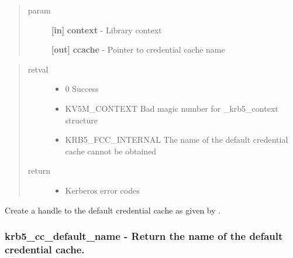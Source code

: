 \documentclass[letterpaper,10pt,english]{sphinxmanual}
\begin{document}
\begin{fulllineitems}
\label{appdev/refs/api/krb5_cc_default:c.krb5_cc_default}
\end{fulllineitems}

\begin{quote}\begin{description}
\item[{param}] \leavevmode
\textbf{{[}in{]}} \textbf{context} - Library context

\textbf{{[}out{]}} \textbf{ccache} - Pointer to credential cache name

\end{description}\end{quote}
\begin{quote}\begin{description}
\item[{retval}] \leavevmode\begin{itemize}
\item {} 
0   Success

\item {} 
KV5M\_CONTEXT   Bad magic number for \_krb5\_context structure

\item {} 
KRB5\_FCC\_INTERNAL   The name of the default credential cache cannot be obtained

\end{itemize}

\item[{return}] \leavevmode\begin{itemize}
\item {} 
Kerberos error codes

\end{itemize}

\end{description}\end{quote}

Create a handle to the default credential cache as given by {\hyperref[appdev/refs/api/krb5_cc_default_name:c.krb5_cc_default_name]{}} .


\subsubsection{krb5\_cc\_default\_name -  Return the name of the default credential cache.}
\label{appdev/refs/api/krb5_cc_default_name::doc}\label{appdev/refs/api/krb5_cc_default_name:krb5-cc-default-name-return-the-name-of-the-default-credential-cache}
\end{document}

